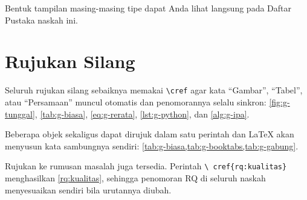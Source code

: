 \nocite{contoh-buku, contoh-babbuku, contoh-prosiding, contoh-skripsi,
        contoh-laporan, contoh-standar, contoh-web}

Bentuk tampilan masing-masing tipe dapat Anda lihat langsung pada Daftar
Pustaka naskah ini.

\section{Rujukan Silang}

Seluruh rujukan silang sebaiknya memakai \texttt{\textbackslash cref} agar kata
``Gambar'', ``Tabel'', atau ``Persamaan'' muncul otomatis dan penomorannya
selalu sinkron: \cref{fig:g-tunggal}, \cref{tab:g-biasa}, \cref{eq:g-rerata},
\cref{lst:g-python}, dan \cref{alg:g-ipa}.

Beberapa objek sekaligus dapat dirujuk dalam satu perintah dan LaTeX akan
menyusun kata sambungnya sendiri: \cref{tab:g-biasa,tab:g-booktabs,tab:g-gabung}.

Rujukan ke rumusan masalah juga tersedia. Perintah \texttt{\textbackslash
cref\{rq:kualitas\}} menghasilkan \cref{rq:kualitas}, sehingga penomoran RQ di
seluruh naskah menyesuaikan sendiri bila urutannya diubah.
